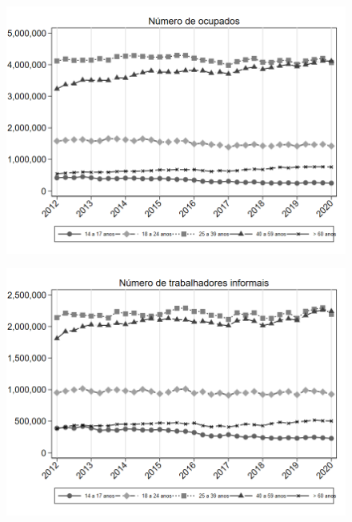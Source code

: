 \begin{frame}[label=_composicao_demografica_faixa_etaria_n_de_ocupacao]{}
\textit{\hyperlink{_composicao_demografica_faixa_etaria}{}}
\begin{figure}
  \centering
  \includegraphics[width=1\linewidth]{../../analysis/output/composicao_demografica/faixa_etaria/_composicao_demografica_faixa_etaria_n_de_ocupacao.png}
  \caption{}
  \label{fig:_composicao_demografica_faixa_etaria_n_de_ocupacao}
\end{figure}
\end{frame}

\begin{frame}[label=_composicao_demografica_faixa_etaria_n_de_informalidade]{}
\textit{\hyperlink{_composicao_demografica_faixa_etaria}{}}
\begin{figure}
  \centering
  \includegraphics[width=1.0\linewidth]{../../analysis/output/composicao_demografica/faixa_etaria/_composicao_demografica_faixa_etaria_n_de_informalidade.png}
  \caption{}
  \label{fig:_composicao_demografica_faixa_etaria_n_de_informalidade}
\end{figure}
\end{frame}

